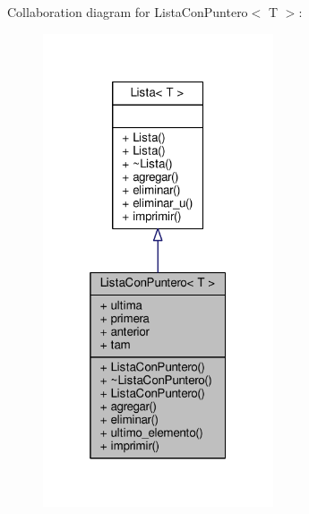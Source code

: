 Collaboration diagram for Lista\+Con\+Puntero$<$ T $>$\+:
\nopagebreak
\begin{figure}[H]
\begin{center}
\leavevmode
\includegraphics[width=193pt]{class_lista_con_puntero__coll__graph}
\end{center}
\end{figure}
